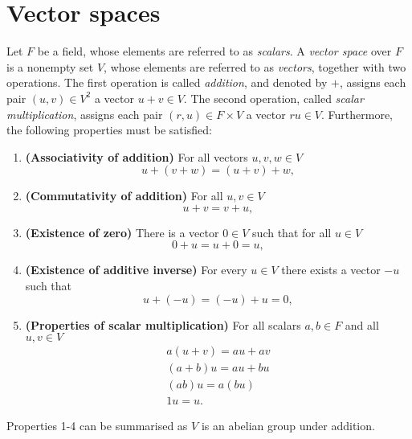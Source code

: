 \documentclass[12pt]{article}
\begin{document}
\section{Vector spaces}
\begin{definition}
Let $F$ be a field, whose elements are referred to as \textit{scalars}. A \textit{vector space} over $F$ is a nonempty set $V$, whose elements are referred to as \textit{vectors}, together with two operations. The first operation is called \textit{addition}, and denoted by $+$, assigns each pair $(u,v)\in V^2$ a vector $u+v\in V$. The second operation, called \textit{scalar multiplication}, assigns each pair $(r,u)\in F\times V$ a vector $ru\in V$. Furthermore, the following properties must be satisfied:
\begin{enumerate}
    \item \textbf{(Associativity of addition)} For all vectors $u,v,w\in V$
    \begin{equation*}
        u+(v+w)=(u+v)+w,
    \end{equation*}
    \item \textbf{(Commutativity of addition)} For all $u,v\in V$
    \begin{equation*}
        u+v=v+u,
    \end{equation*}
    \item \textbf{(Existence of zero)} There is a vector $0\in V$ such that for all $u\in V$
    \begin{equation*}
        0+u=u+0=u,
    \end{equation*}
    \item \textbf{(Existence of additive inverse)} For every $u\in V$ there exists a vector $-u$ such that
    \begin{equation*}
        u+(-u)=(-u)+u=0,
    \end{equation*}
    \item \textbf{(Properties of scalar multiplication)} For all scalars $a,b\in F$ and all $u,v\in V$
    \begin{gather*}
        a(u+v)=au+av\\
        (a+b)u=au+bu\\
        (ab)u=a(bu)\\
        1u=u.
    \end{gather*}
\end{enumerate}
\end{definition}
\begin{remark}
    Properties 1-4 can be summarised as $V$ is an abelian group under addition.
\end{remark}
\end{document}
